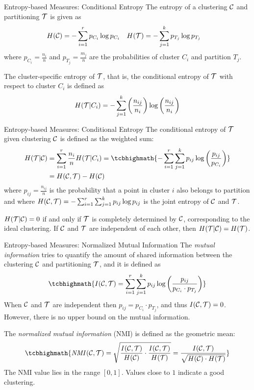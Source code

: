 \begin{frame}{Entropy-based Measures: Conditional Entropy}
The entropy of a clustering ${\mathcal C}$  and partitioning ${\mathcal T}$ is given as
\begin{align*}
  H({\mathcal C}) & = - \sum_{i=1}^r p_{C_i} \log p_{C_i} &
  H({\mathcal T}) & = - \sum_{j=1}^k p_{T_{j}} \log p_{T_{j}}
\end{align*}
where $p_{C_i} = \tfrac{n_i}{n}$ and $p_{T_{j}} = \tfrac{m_{j}}{n}$
are the probabilities of cluster $C_i$ and partition $T_{j}$.

\bigskip
The cluster-specif\/{i}c entropy of ${\mathcal T}$, that is, the conditional entropy of
${\mathcal T}$ with respect to cluster $C_i$ is def\/{i}ned as
\begin{align*}
  H({\mathcal T}|C_i) = - \sum_{j=1}^k
  \left( \frac{n_{ij}}{n_i} \right)
  \log \left( \frac{n_{ij}}{n_i} \right)
\end{align*}
\end{frame}

\begin{frame}{Entropy-based Measures: Conditional Entropy}
The conditional entropy of ${\mathcal T}$ given clustering ${\mathcal C}$ is def\/{i}ned
as the weighted sum:
\begin{align*}
  H(\cT|\cC) & = \sum_{i=1}^r \frac{n_{i}}{n} H(\cT|C_i)
  = 
\tcbhighmath{
-\sum_{i=1}^r \sum_{j=1}^k p_{ij} \log \lB(
  \frac{p_{ij}}{p_{C_i}}\rB)
}
\\
  & = H(\cC,\cT) - H(\cC)
\end{align*}
where $p_{ij}= \tfrac{n_{ij}}{n}$ is the probability that a point in
cluster $i$ also belongs to partition and 
where $H({\mathcal C},{\mathcal T}) = - \sum_{i=1}^r \sum_{j=1}^k p_{ij} \log p_{ij}$ is
the joint entropy of ${\mathcal C}$ and ${\mathcal T}$.  

\bigskip
$H({\mathcal T}|{\mathcal C}) = 0$ if and only if
${\mathcal T}$ is completely determined by ${\mathcal C}$, corresponding to the ideal
clustering.
If ${\mathcal C}$ and ${\mathcal T}$ are independent of
each other, then $H({\mathcal T}|{\mathcal C}) = H({\mathcal T})$.
\end{frame}


\begin{frame}{Entropy-based Measures: Normalized Mutual Information} 
The {\em mutual
information} tries to quantify the amount of shared information
between the clustering ${\mathcal C}$ and partitioning ${\mathcal T}$, and it is
def\/{i}ned as
\begin{align*}
\tcbhighmath{
  I(\cC,\cT) = \sum_{i=1}^r \sum_{j=1}^k p_{ij} \log
  \lB(\frac{p_{ij}}{p_{C_i} \cdot p_{T_{j}}} \rB)
}
\end{align*}
When ${\mathcal C}$ and ${\mathcal T}$
are independent then $p_{ij} = p_{C_i} \cdot p_{T_{j}}$, and thus
$I({\mathcal C},{\mathcal T}) = 0$. However, there is no upper bound on the mutual
information.


\bigskip
The {\em normalized mutual information} (NMI) is def\/{i}ned as
the geometric mean:
\begin{align*}
\tcbhighmath{
  \NMI(\cC,\cT) = \sqrt{\frac{I(\cC,\cT)}{H(\cC)} \cdot \frac{I(\cC,\cT)}{H(\cT)}} =
  \frac{I(\cC,\cT)}{\sqrt{H(\cC)\cdot H(\cT)}}
}
\end{align*}
The NMI value lies in the range $[0,1]$. Values close to $1$ indicate a
good clustering.
\end{frame}




